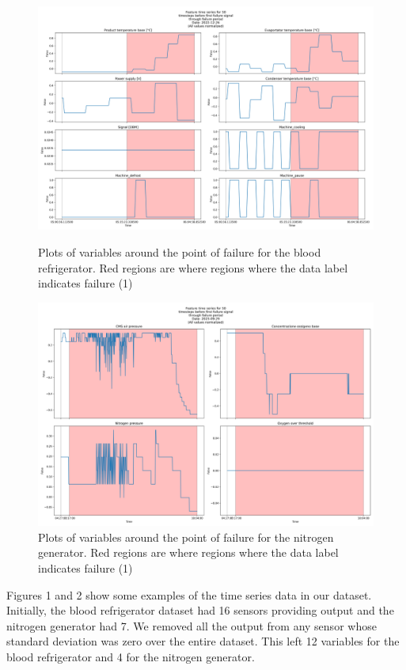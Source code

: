 \documentclass[12pt]{article}
\begin{document}
\begin{figure}
    \centering
    \includegraphics[width=16cm]{assets/test/blood-refrigerator/features.png}
    \caption{Plots of variables around the point of failure for the blood refrigerator. Red regions are where regions where the data label indicates failure (1)}
    \centering
    \includegraphics[width=16cm]{assets/test/nitrogen-generator/features.png}
    \caption{Plots of variables around the point of failure for the nitrogen generator. Red regions are where regions where the data label indicates failure (1)}
\end{figure}

Figures 1 and 2 show some examples of the time series data in our dataset. Initially, the blood refrigerator dataset had 16 sensors
providing output and the nitrogen generator had 7. We removed all the output from any sensor whose standard deviation was zero over
the entire dataset. This left 12 variables for the blood refrigerator and 4 for the nitrogen generator.
\end{document}
